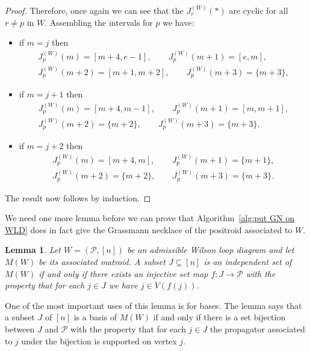 \documentclass[11pt]{article}
\newcommand{\cP}{\mathcal{P}}
\newtheorem{lem}[thm]{Lemma}
\theoremstyle{remark}
\theoremstyle{definition}
\begin{document}
\begin{proof}
Therefore, once again we can see that the $J_r^{(W)}(*)$ are cyclic for all $r\neq p$ in $W$.  Assembling the intervals for $p$ we have:
\begin{itemize}
\item if $m=j$ then
\begin{gather*}J_p^{(W)}(m) = [m+4,e-1], \qquad  J_p^{(W)}(m+1) = [e,m], \\  J_p^{(W)}(m+2) = [m+1,m+2], \qquad  J_p^{(W)}(m+3) = \{m+3\},\end{gather*}
\item if $m=j+1$ then
\begin{gather*}J_p^{(W)}(m) = [m+4,m-1], \qquad J_p^{(W)}(m+1) = [m,m+1], \\  J_p^{(W)}(m+2) = \{m+2\}, \qquad  J_p^{(W)}(m+3) = \{m+3\},\end{gather*}
\item if $m=j+2$ then
\begin{gather*}J_p^{(W)}(m) = [m+4,m], \qquad  J_p^{(W)}(m+1) = \{m+1\}, \\  J_p^{(W)}(m+2) = \{m+2\}, \qquad  J_p^{(W)}(m+3) = \{m+3\}.\end{gather*}
\end{itemize}
The result now follows by induction.
\end{proof}



We need one more lemma before we can prove that Algorithm~\ref{alg:put GN on WLD} does in fact give the Grassmann necklace of the positroid associated to $W$.

\begin{lem}\label{lem basis as perm}
Let $W = (\cP,[n])$ be an admissible Wilson loop diagram and let $M(W)$ be its associated matroid. A subset $J \subseteq [n]$ is an independent set of $M(W)$ if and only if there exists an injective set map $f : J \rightarrow \cP$ with the property that for each $j\in J$ we have $j \in V(f(j))$.
\end{lem}

One of the most important uses of this lemma is for bases.  The lemma says that a subset $J$ of $[n]$ is a basis of $M(W)$ if and only if there is a set bijection between $J$ and $\cP$ with the property that for each $j\in J$ the propagator associated to $j$ under the bijection is supported on vertex $j$.
\end{document}
